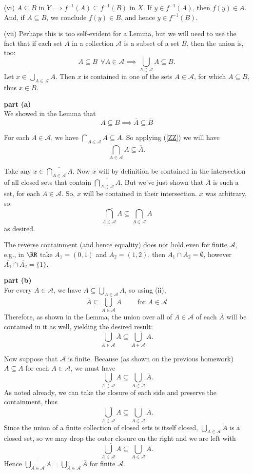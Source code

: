 \documentclass{homework}
\newcommand{\calA}{\mathcal{A}}
\begin{document}
(vi) $A\subseteq B$ in $Y \implies f^{-1}(A)\subseteq f^{-1}(B)$ in $X$.
If $y\in f^{-1}(A)$, then $f(y)\in A$.  And, if $A\subseteq B$, we conclude
$f(y)\in B$, and hence $y\in f^{-1}(B)$.

(vii) Perhaps this is too self-evident for a Lemma, but we will need to use the
fact that if each set $A$ in a collection $\calA$ is a subset of a set $B$, then
the union is, too:
$$ A\subseteq B\ \ \forall A\in\calA \implies \bigcup_{A\in\calA} A \subseteq B. $$
Let $x\in \displaystyle\bigcup_{A\in\calA} A$.  Then $x$ is contained in one
of the sets $A\in\calA$, for which $A\subseteq B$, thus $x\in B$.

\textbf{part (a)}\\
We showed in the Lemma that
\begin{equation}
A\subseteq B\implies\overline{A}\subseteq\overline{B}\label{ZZ}
\end{equation}

For each $A\in\calA$, we have $\displaystyle\bigcap_{A\in\calA}A\subseteq A$.
So applying (\ref{ZZ}) we will have
$$\overline{\bigcap_{A\in\calA}A}\subseteq \overline{A}.$$

Take any $x\in\displaystyle\overline{\bigcap_{A\in\calA}A}$.  Now $x$ will
by definition be contained in the intersection of all closed sets that
contain $\displaystyle\overline{\bigcap_{A\in\calA}A}$.  But we've just shown
that $\overline{A}$ is such a set, for each $A\in\calA$.  So, $x$ will be
contained in their intersection. $x$ was arbitrary, so:
$$\overline{\bigcap_{A\in\calA} A} \subseteq \bigcap_{A\in\calA} \overline{A}$$
as desired.

The reverse containment (and hence equality) does not hold even for finite $\calA$, e.g.,
in $\RR$ take $A_1=(0,1)$ and $A_2=(1,2)$, then
$\overline{A_1\cap A_2}=\emptyset$, however $\overline{A_1}\cap\overline{A_2}=\{1\}$.

\textbf{part (b)}\\
For every $A\in\calA$, we have $A \subseteq \displaystyle\bigcup_{A\in\calA}A$, so using (ii),
$$ \overline{A} \subseteq \overline{\bigcup_{A\in\calA} A}\qquad\text{ for }A\in\calA $$
Therefore, as shown in the Lemma, the union over all of
$A\in\calA$ of each $\overline{A}$ will be contained in it
as well, yielding the desired result:
$$ \bigcup_{A\in\calA} \overline{A} \subseteq \overline{\bigcup_{A\in\calA} A}. $$

Now suppose that $\calA$ is finite.  Because (as shown on the previous
homework) $A\subseteq \overline{A}$ for each $A\in\calA$, we must have
$$\bigcup_{A\in\calA} A \subseteq \bigcup_{A\in\calA}\overline{A}.$$
As noted already, we can take the closure of each side and preserve the
containment, thus
$$\overline{\bigcup_{A\in\calA} A} \subseteq \overline{\bigcup_{A\in\calA}\overline{A}}.$$
Since the union of a finite collection
of closed sets is itself closed, $\displaystyle\bigcup_{A\in\calA}\overline{A}$ is a closed set,
so we may drop the outer closure on the right and we are left with
$$\overline{\bigcup_{A\in\calA} A} \subseteq \bigcup_{A\in\calA}\overline{A}.$$
Hence $\displaystyle\overline{\bigcup_{A\in\calA} A} = \bigcup_{A\in\calA}\overline{A}$ for
finite $\calA$.
\end{document}
